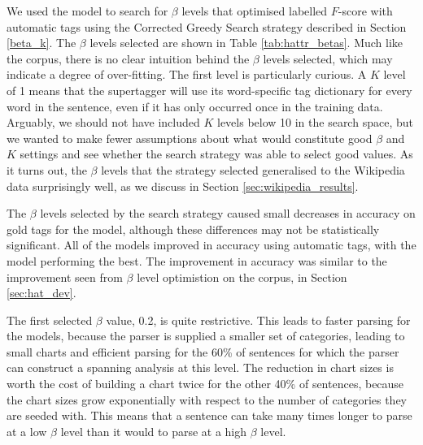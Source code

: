 We used the \derivsrev model to search for $\beta$ levels that optimised
labelled $F$-score with automatic \pos tags using the Corrected Greedy Search
strategy described in Section \ref{beta_k}. The $\beta$ levels selected are
shown in Table \ref{tab:hattr_betas}. Much like the \nounary corpus, there is no
clear intuition behind the $\beta$ levels selected, which may indicate a degree
of over-fitting. The first level is particularly curious. A $K$ level of 1 means
that the supertagger will use its word-specific tag dictionary for every word in
the sentence, even if it has only occurred once in the training data. Arguably,
we should not have included $K$ levels below 10 in the search space, but we
wanted to make fewer assumptions about what would constitute good $\beta$ and
$K$ settings and see whether the search strategy was able to select good values.
As it turns out, the $\beta$ levels that the strategy selected generalised to
the Wikipedia data surprisingly well, as we discuss in Section
\ref{sec:wikipedia_results}.

The $\beta$ levels selected by the search strategy caused small decreases in
accuracy on gold \pos tags for the \derivsrev model,
although these differences may not be statistically significant. All of the
models improved in accuracy using automatic \pos tags, with the
\derivsrev\optbeta model performing the best. The improvement in accuracy was
similar to the improvement seen from $\beta$ level optimistion on the \hatsys
corpus, in Section \ref{sec:hat_dev}.

The first selected $\beta$ value, 0.2, is quite restrictive. This leads to
faster parsing for the \derivs models, because the parser is supplied a smaller
set of categories, leading to small charts and efficient parsing for the 60\% of
sentences for which the parser can construct a spanning analysis at this level.
The reduction in chart sizes is worth the cost of building a chart twice for the
other 40\% of sentences, because the chart sizes grow exponentially with respect
to the number of categories they are seeded with. This means that a sentence can
take many times longer to parse at a low $\beta$ level than it would to parse at
a high $\beta$ level.


